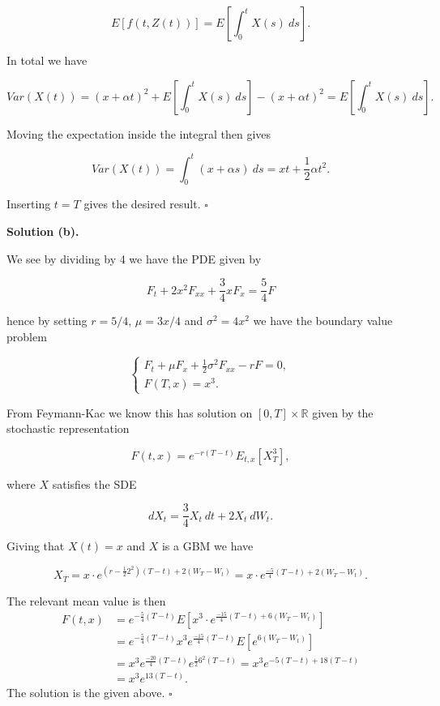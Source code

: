 \documentclass[a4paper,12pt,openany]{book}
\begin{document}
\[
E[f(t,Z(t))]=E\left[\int_0^t X(s)\ ds\right].
\]

In total we have

\[
Var(X(t))=(x+\alpha t)^2+E\left[\int_0^t X(s)\ ds\right]-(x+\alpha t)^2=E\left[\int_0^t X(s)\ ds\right].
\]

Moving the expectation inside the integral then gives

\[
Var(X(t))=\int_0^t(x+\alpha s)\ ds=xt+\frac{1}{2}\alpha t^2.
\]

Inserting \(t=T\) gives the desired result. \(\square\)

\noindent\makebox[\linewidth]{\rule{\textwidth}{0.4pt}}

\textbf{Solution (b).}

We see by dividing by 4 we have the PDE given by

\[
F_t+2x^2F_{xx}+\frac{3}{4}xF_x=\frac{5}{4}F
\]

hence by setting \(r=5/4\), \(\mu=3x/4\) and \(\sigma^2=4x^2\) we have the boundary value problem

\[
\begin{cases}
F_t+\mu F_x+\frac{1}{2}\sigma ^2F_{xx}-rF=0,\\
F(T,x)=x^3.
\end{cases}
\]

From Feymann-Kac we know this has solution on \([0,T]\times\mathbb{R}\) given by the stochastic representation

\[
F(t,x)=e^{-r(T-t)}E_{t,x}[X_T^3],
\]

where \(X\) satisfies the SDE

\[
dX_t=\frac{3}{4}X_t\ dt+2X_t\ dW_t.
\]

Giving that \(X(t)=x\) and \(X\) is a GBM we have

\[
X_T=x\cdot e^{\left(r-\frac{1}{2}2^2\right)(T-t)+2(W_T-W_t)}=x\cdot e^{\frac{-5}{4}(T-t)+2(W_T-W_t)}.
\]

The relevant mean value is then
\begin{align*}
F(t,x)&=e^{-\frac{5}{4}(T-t)}E\left[x^3\cdot e^{\frac{-15}{4}(T-t)+6(W_T-W_t)}\right]\\
&=e^{-\frac{5}{4}(T-t)}x^3e^{\frac{-15}{4}(T-t)}E\left[e^{6(W_T-W_t)}\right]\\
&=x^3e^{\frac{-20}{4}(T-t)}e^{\frac{1}{2}6^2(T-t)}=x^3e^{-5(T-t)+18(T-t)}\\
&=x^3e^{13(T-t)}.
\end{align*}
The solution is the given above. \(\square\)

\noindent\makebox[\linewidth]{\rule{\textwidth}{0.4pt}}
\end{document}
